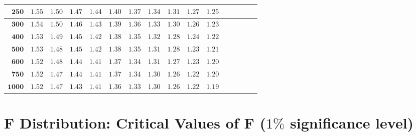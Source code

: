 \begin{alternateColorTable}
\begin{longtable}{|r|r|r|r|r|r|r|r|r|r|r|r|r|r|r|r|}
    \(\mathbf{250}\)& \(1.55\) & \(1.50\) & \(1.47\) & \(1.44\) & \(1.40\) & \(1.37\) & \(1.34\) & \(1.31\) & \(1.27\) & \(1.25\) \\ \hline 
    \(\mathbf{300}\)& \(1.54\) & \(1.50\) & \(1.46\) & \(1.43\) & \(1.39\) & \(1.36\) & \(1.33\) & \(1.30\) & \(1.26\) & \(1.23\) \\ \hline 
    \(\mathbf{400}\)& \(1.53\) & \(1.49\) & \(1.45\) & \(1.42\) & \(1.38\) & \(1.35\) & \(1.32\) & \(1.28\) & \(1.24\) & \(1.22\) \\ \hline 
    \(\mathbf{500}\)& \(1.53\) & \(1.48\) & \(1.45\) & \(1.42\) & \(1.38\) & \(1.35\) & \(1.31\) & \(1.28\) & \(1.23\) & \(1.21\) \\ \hline 
    \(\mathbf{600}\)& \(1.52\) & \(1.48\) & \(1.44\) & \(1.41\) & \(1.37\) & \(1.34\) & \(1.31\) & \(1.27\) & \(1.23\) & \(1.20\) \\ \hline 
    \(\mathbf{750}\)& \(1.52\) & \(1.47\) & \(1.44\) & \(1.41\) & \(1.37\) & \(1.34\) & \(1.30\) & \(1.26\) & \(1.22\) & \(1.20\) \\ \hline 
    \(\mathbf{1000}\)& \(1.52\) & \(1.47\) & \(1.43\) & \(1.41\) & \(1.36\) & \(1.33\) & \(1.30\) & \(1.26\) & \(1.22\) & \(1.19\) \\ \hline 


\end{longtable}
\end{alternateColorTable}
\changefontsizes{11pt}


\newpage

\section{F Distribution: Critical Values of F ($1\%$ significance level)}


\setlength{\LTleft}{-1cm} %
\setlength{\LTright}{-1cm} %

